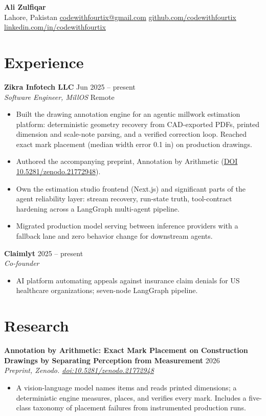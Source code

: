 \documentclass[10pt]{article}
\newcommand{\entry}[4]{\noindent\textbf{#1} \hfill #2\\ \textit{#3} \hfill #4\par}
\begin{document}
\begin{center}
  {\LARGE\bfseries Ali Zulfiqar}\\[3pt]
  Lahore, Pakistan \;\textbullet\;
  \href{mailto:codewithfourtix@gmail.com}{codewithfourtix@gmail.com} \;\textbullet\;
  \href{https://github.com/codewithfourtix}{github.com/codewithfourtix} \;\textbullet\;
  \href{https://www.linkedin.com/in/codewithfourtix/}{linkedin.com/in/codewithfourtix}
\end{center}

\section{Experience}

\entry{Zikra Infotech LLC}{Jun 2025 -- present}{Software Engineer, MillOS}{Remote}
\begin{itemize}
  \item Built the drawing annotation engine for an agentic millwork estimation
  platform: deterministic geometry recovery from CAD-exported PDFs, printed
  dimension and scale-note parsing, and a verified correction loop. Reached
  exact mark placement (median width error 0.1 in) on production drawings.
  \item Authored the accompanying preprint, Annotation by Arithmetic
  (\href{https://doi.org/10.5281/zenodo.21772948}{DOI 10.5281/zenodo.21772948}).
  \item Own the estimation studio frontend (Next.js) and significant parts of
  the agent reliability layer: stream recovery, run-state truth, tool-contract
  hardening across a LangGraph multi-agent pipeline.
  \item Migrated production model serving between inference providers with a
  fallback lane and zero behavior change for downstream agents.
\end{itemize}

\entry{Claimlyt}{2025 -- present}{Co-founder}{}
\begin{itemize}
  \item AI platform automating appeals against insurance claim denials for US
  healthcare organizations; seven-node LangGraph pipeline.
\end{itemize}

\section{Research}

\entry{Annotation by Arithmetic: Exact Mark Placement on Construction Drawings
by Separating Perception from Measurement}{2026}{Preprint, Zenodo.
\href{https://doi.org/10.5281/zenodo.21772948}{doi:10.5281/zenodo.21772948}}{}
\begin{itemize}
  \item A vision-language model names items and reads printed dimensions; a
  deterministic engine measures, places, and verifies every mark. Includes a
  five-class taxonomy of placement failures from instrumented production runs.
\end{itemize}
\end{document}
